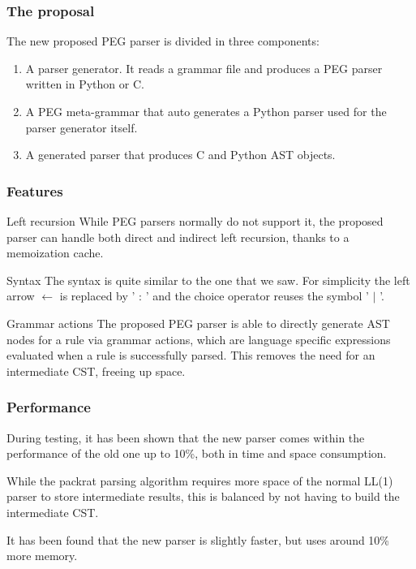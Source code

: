 \begin{frame}
	\frametitle{The proposal}
	The new proposed PEG parser is divided in three components:\begin{enumerate}
		\item A parser generator. It reads  a grammar file and produces a PEG parser written in Python or C.
		
		\item A PEG meta-grammar that auto generates a Python parser used for the parser generator itself.
		\item A generated parser that produces C and Python AST objects.
	\end{enumerate} 
\end{frame}
\begin{frame}
	\frametitle{Features}
	
	\begin{block}{Left recursion}
		While PEG parsers normally do not support it, the proposed parser can handle both direct and indirect left recursion, thanks to a memoization cache.
	\end{block}

	\begin{block}{Syntax}
		The syntax is quite similar to the one that we saw. For simplicity the left arrow $\leftarrow$ is replaced by ' : ' and the choice operator reuses the symbol ' $|$ '.
	\end{block}

	\begin{block}{Grammar actions}
		The proposed PEG parser is able to directly generate AST nodes  for a rule via grammar actions, which are language specific expressions evaluated when a rule is successfully parsed. This removes the need for an intermediate CST, freeing up space.
	\end{block}


\end{frame}
\begin{frame}
\frametitle{Performance}

During testing, it has been shown that the new parser comes within the performance of the old one up to 10\%, both in time and space consumption.

While the packrat parsing algorithm requires more space of the normal LL(1) parser to store intermediate results, this is balanced by not having to build the intermediate CST.

It has been found that the new parser is slightly faster, but uses around 10\% more memory. 
\end{frame}

